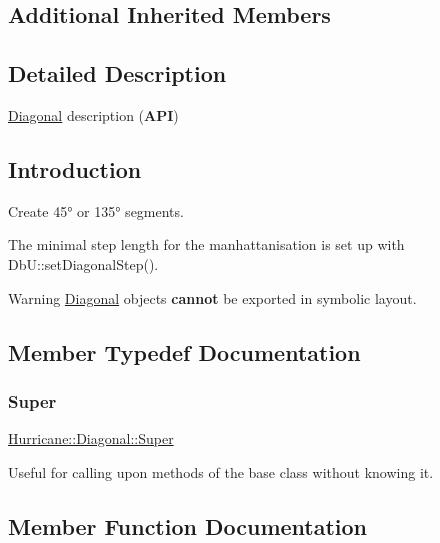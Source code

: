 \subsection*{Additional Inherited Members}


\subsection{Detailed Description}
\mbox{\hyperlink{classHurricane_1_1Diagonal}{Diagonal}} description ({\bfseries A\+PI}) 

\hypertarget{classHurricane_1_1Diagonal_secDiagonalIntro}{}\subsection{Introduction}\label{classHurricane_1_1Diagonal_secDiagonalIntro}
Create 45° or 135° segments.

The minimal step length for the manhattanisation is set up with Db\+U\+::set\+Diagonal\+Step().

\begin{DoxyWarning}{Warning}
\mbox{\hyperlink{classHurricane_1_1Diagonal}{Diagonal}} objects {\bfseries cannot} be exported in symbolic layout. 
\end{DoxyWarning}


\subsection{Member Typedef Documentation}
\mbox{\label{classHurricane_1_1Diagonal_aef5120a04b3b4db78b118e8c5daade90}} 
\subsubsection{\texorpdfstring{Super}{Super}}
{\footnotesize\ttfamily \mbox{\hyperlink{classHurricane_1_1Diagonal_aef5120a04b3b4db78b118e8c5daade90}{Hurricane\+::\+Diagonal\+::\+Super}}}

Useful for calling upon methods of the base class without knowing it. 

\subsection{Member Function Documentation}
\mbox{\label{classHurricane_1_1Diagonal_a83cd4332e78515e2c3745fd017e7441f}} 
